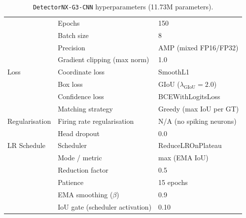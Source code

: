 \begin{table}[H]
\begin{tabular}{|l|l|l|}
                 & Epochs                               & 150 \\
                 & Batch size                           & 8 \\
                 & Precision                            & AMP (mixed FP16/FP32) \\
                 & Gradient clipping (max norm)         & 1.0 \\
\hline
Loss             & Coordinate loss                      & SmoothL1 \\
                 & Box loss                             & GIoU ($\lambda_{\text{GIoU}} = 2.0$) \\
                 & Confidence loss                      & BCEWithLogitsLoss \\
                 & Matching strategy                    & Greedy (max IoU per GT) \\
\hline
Regularisation   & Firing rate regularisation           & N/A (no spiking neurons) \\
                 & Head dropout                         & 0.0 \\
\hline
LR Schedule      & Scheduler                            & ReduceLROnPlateau \\
                 & Mode / metric                        & max (EMA IoU) \\
                 & Reduction factor                     & 0.5 \\
                 & Patience                             & 15 epochs \\
                 & EMA smoothing ($\beta$)              & 0.9 \\
                 & IoU gate (scheduler activation)      & 0.10 \\
\hline
\end{tabular}
\caption[\texttt{DetectorNX-G3-CNN} hyperparameters.]{\texttt{DetectorNX-G3-CNN} hyperparameters (11.73M parameters).}
\label{tab_app:g3_cnn_params}
\end{table}